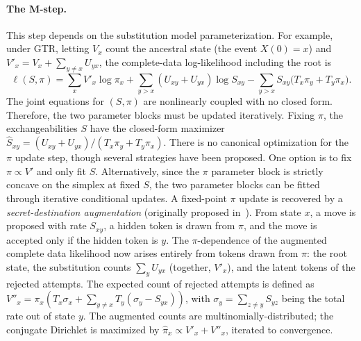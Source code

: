 \documentclass{article}
\begin{document}
\paragraph{The M-step.} This step depends on the substitution model parameterization.
For example, under GTR, letting $V_x$ count the ancestral state
(the event $X(0)=x$) and $V'_x=V_x+\sum_{y\ne x}U_{yx}$, the
complete-data log-likelihood including the root is
\begin{equation}
\label{eq:ell2}
\ell(S,\pi)=\sum_x V'_x\log\pi_x+\sum_{y>x}(U_{xy}{+}U_{yx})\log S_{xy}
 -\sum_{y>x}S_{xy}\big(T_x\pi_y+T_y\pi_x\big).
\end{equation}
The joint equations for $(S,\pi)$ are nonlinearly coupled with no closed form.
Therefore, the two parameter blocks must be updated iteratively.
Fixing $\pi$, the exchangeabilities $S$ have the closed-form maximizer
$\widehat S_{xy}=(U_{xy}{+}U_{yx})/(T_x\pi_y+T_y\pi_x)$.
There is no canonical optimization for the $\pi$ update step, though several strategies have been proposed.
One option is to fix $\pi\propto V'$ and only fit $S$.
Alternatively, since the $\pi$ parameter block is strictly concave on the simplex at fixed $S$, the two parameter blocks can be fitted through iterative conditional updates.
A fixed-point $\pi$ update is recovered by a \emph{secret-destination augmentation} (originally proposed in~\citet{Bruno1996}).
From state $x$, a move is proposed with rate $S_{xy}$, a hidden token is drawn from $\pi$, and the move is accepted only if the hidden token is $y$.
The $\pi$-dependence of the augmented complete data likelihood now arises entirely from tokens drawn from $\pi$:
the root state, the substitution counts $\sum_{y}U_{yx}$ (together, $V'_x$), and the latent tokens of the rejected attempts.
The expected count of rejected attempts is defined as $V''_x = \pi_x( T_x \sigma_x + \sum_{y\ne x} T_y(\sigma_y-S_{yx}) )$, with $\sigma_y=\sum_{z\ne y}S_{yz}$ being the total rate out of state $y$.
The augmented counts are multinomially-distributed; the conjugate Dirichlet is maximized by $\widehat\pi_x\propto V'_x+V''_x$,
iterated to convergence.


\end{document}
